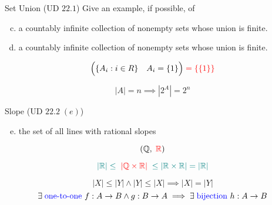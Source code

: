 \begin{frame}{}
  \begin{exampleblock}{Set Union (UD $22.1$)}
    Give an example, if possible, of
    \begin{enumerate}[(a)]
      \setcounter{enumi}{2}
      \item a countably infinite collection of  nonempty sets whose union is finite.
      \setcounter{enumi}{1}
      \pause
      \item a countably infinite collection of nonempty sets whose union is finite.
    \end{enumerate}
  \end{exampleblock}

  \pause
  \[
    \Big(\{A_i: i \in R\} \quad A_{i} = \{1\}\Big) \;\textcolor{red}{= \{\{1\}\}}
  \]

  \pause
  \[
    |A| = n \implies |2^{A}| = 2^n
  \]
\end{frame}

\begin{frame}{}
  \begin{exampleblock}{Slope (UD $22.2 \;(e)$)}
    \begin{enumerate}[(a)]
      \setcounter{enumi}{4}
      \item the set of all lines with rational slopes
    \end{enumerate}
  \end{exampleblock}

  \pause
  \[
    (\mathbb{Q}, \;\textcolor{red}{\mathbb{R}})
  \]

  \pause
  \[
    \textcolor{teal}{|\mathbb{R}| \le \;\textcolor{red}{|\mathbb{Q} \times \mathbb{R}|}\; \le |\mathbb{R} \times \mathbb{R}| = |\mathbb{R}|}
  \]
\end{frame}

\begin{frame}{}
  \centerline{\large {}}

  \pause
  \vspace{0.30cm}
  \begin{theorem}
    \[
      |X| \le |Y| \land |Y| \le |X| \implies |X| = |Y|
    \]
    \pause
    \[
      \exists\; \text{\textcolor{blue}{one-to-one} } f: A \to B \land g: B \to A \implies \exists\; \text{\textcolor{blue}{bijection} } h: A \to B
    \]
  \end{theorem}

  \pause
  \begin{columns}
      \pause
      \pause
  \end{columns}
\end{frame}

